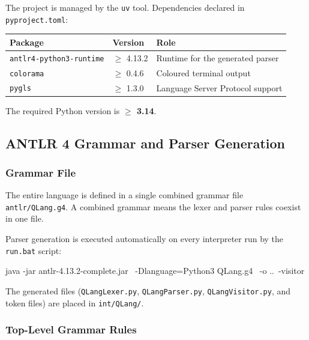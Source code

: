 The project is managed by the \texttt{uv} tool. Dependencies declared in
\texttt{pyproject.toml}:

\begin{center}
\begin{tabular}{|l|l|p{8cm}|}
\hline
\textbf{Package} & \textbf{Version} & \textbf{Role} \\
\hline
\texttt{antlr4-python3-runtime} & $\geq$ 4.13.2 & Runtime for the generated parser \\
\texttt{colorama}               & $\geq$ 0.4.6  & Coloured terminal output \\
\texttt{pygls}                  & $\geq$ 1.3.0  & Language Server Protocol support \\
\hline
\end{tabular}
\end{center}

The required Python version is \textbf{$\geq$ 3.14}.

\subsection{ANTLR 4 Grammar and Parser Generation}
\label{sec:impl-antlr}

\subsubsection{Grammar File}

The entire language is defined in a single combined grammar file
\texttt{antlr/QLang.g4}. A combined grammar means the lexer and
parser rules coexist in one file.

Parser generation is executed automatically on every interpreter run by the
\texttt{run.bat} script:

\begin{codebox}
java -jar antlr-4.13.2-complete.jar \
     -Dlanguage=Python3 QLang.g4 \
     -o ..\int\QLang\ -visitor
\end{codebox}

The generated files (\texttt{QLangLexer.py}, \texttt{QLangParser.py},
\texttt{QLangVisitor.py}, and token files) are placed in
\texttt{int/QLang/}.

\subsubsection{Top-Level Grammar Rules}

